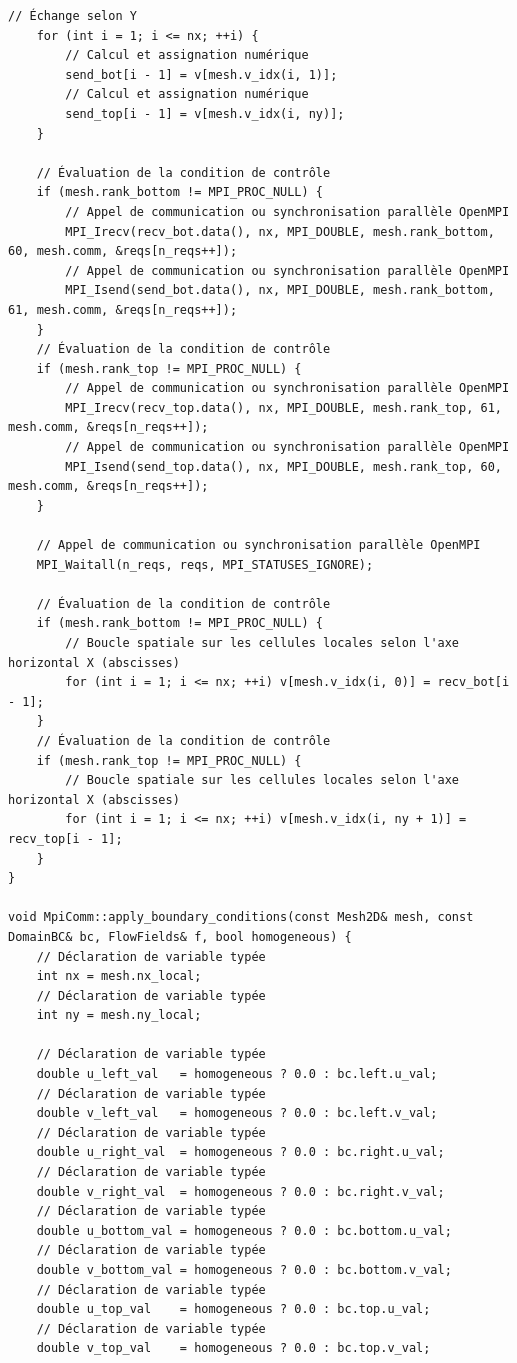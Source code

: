 \documentclass[10pt,a4paper,oneside]{book}
\begin{document}
\begin{lstlisting}[language={[11]C++}]
    // Échange selon Y
    for (int i = 1; i <= nx; ++i) {
        // Calcul et assignation numérique
        send_bot[i - 1] = v[mesh.v_idx(i, 1)];
        // Calcul et assignation numérique
        send_top[i - 1] = v[mesh.v_idx(i, ny)];
    }

    // Évaluation de la condition de contrôle
    if (mesh.rank_bottom != MPI_PROC_NULL) {
        // Appel de communication ou synchronisation parallèle OpenMPI
        MPI_Irecv(recv_bot.data(), nx, MPI_DOUBLE, mesh.rank_bottom, 60, mesh.comm, &reqs[n_reqs++]);
        // Appel de communication ou synchronisation parallèle OpenMPI
        MPI_Isend(send_bot.data(), nx, MPI_DOUBLE, mesh.rank_bottom, 61, mesh.comm, &reqs[n_reqs++]);
    }
    // Évaluation de la condition de contrôle
    if (mesh.rank_top != MPI_PROC_NULL) {
        // Appel de communication ou synchronisation parallèle OpenMPI
        MPI_Irecv(recv_top.data(), nx, MPI_DOUBLE, mesh.rank_top, 61, mesh.comm, &reqs[n_reqs++]);
        // Appel de communication ou synchronisation parallèle OpenMPI
        MPI_Isend(send_top.data(), nx, MPI_DOUBLE, mesh.rank_top, 60, mesh.comm, &reqs[n_reqs++]);
    }

    // Appel de communication ou synchronisation parallèle OpenMPI
    MPI_Waitall(n_reqs, reqs, MPI_STATUSES_IGNORE);

    // Évaluation de la condition de contrôle
    if (mesh.rank_bottom != MPI_PROC_NULL) {
        // Boucle spatiale sur les cellules locales selon l'axe horizontal X (abscisses)
        for (int i = 1; i <= nx; ++i) v[mesh.v_idx(i, 0)] = recv_bot[i - 1];
    }
    // Évaluation de la condition de contrôle
    if (mesh.rank_top != MPI_PROC_NULL) {
        // Boucle spatiale sur les cellules locales selon l'axe horizontal X (abscisses)
        for (int i = 1; i <= nx; ++i) v[mesh.v_idx(i, ny + 1)] = recv_top[i - 1];
    }
}

void MpiComm::apply_boundary_conditions(const Mesh2D& mesh, const DomainBC& bc, FlowFields& f, bool homogeneous) {
    // Déclaration de variable typée
    int nx = mesh.nx_local;
    // Déclaration de variable typée
    int ny = mesh.ny_local;

    // Déclaration de variable typée
    double u_left_val   = homogeneous ? 0.0 : bc.left.u_val;
    // Déclaration de variable typée
    double v_left_val   = homogeneous ? 0.0 : bc.left.v_val;
    // Déclaration de variable typée
    double u_right_val  = homogeneous ? 0.0 : bc.right.u_val;
    // Déclaration de variable typée
    double v_right_val  = homogeneous ? 0.0 : bc.right.v_val;
    // Déclaration de variable typée
    double u_bottom_val = homogeneous ? 0.0 : bc.bottom.u_val;
    // Déclaration de variable typée
    double v_bottom_val = homogeneous ? 0.0 : bc.bottom.v_val;
    // Déclaration de variable typée
    double u_top_val    = homogeneous ? 0.0 : bc.top.u_val;
    // Déclaration de variable typée
    double v_top_val    = homogeneous ? 0.0 : bc.top.v_val;


\end{lstlisting}
\end{document}
